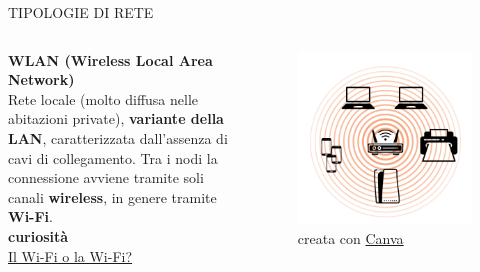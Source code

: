 \documentclass[aspectratio=1610]{beamer}
\begin{document}
\begin{frame}{TIPOLOGIE DI RETE}
    \begin{columns}
            \justifying
            \textbf{WLAN (Wireless Local Area Network)} \\
            Rete locale (molto diffusa nelle abitazioni private), \textbf{variante della LAN}, caratterizzata 
            dall'assenza di cavi di collegamento. Tra i nodi la connessione avviene tramite soli canali \textbf{wireless},
            in genere tramite \textbf{Wi-Fi}.\\
            \bigskip
            \tiny{\textbf{curiosità}}\\
            \href{https://accademiadellacrusca.it/it/consulenza/il-wifi-o-la-wifi-limportante-alla-fine-\%C3\%A8-che-funzioni/1247}{Il Wi-Fi o la Wi-Fi?}
            \begin{figure}
                \includegraphics[width=\linewidth]{img/wlan.png}
                \caption{{creata con \href{https://www.canva.com/}{Canva}}}
            \end{figure}
    \end{columns}
\end{frame}
\end{document}
